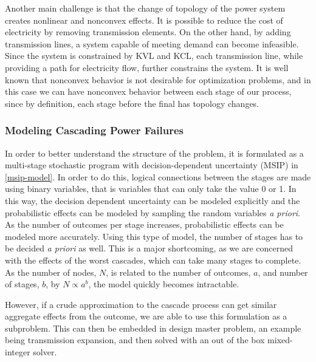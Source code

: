 Another main challenge is that the change of topology of the power system creates nonlinear and nonconvex effects.  It is possible to reduce the cost of electricity by removing transmission elements.  On the other hand, by adding transmission lines, a system capable of meeting demand can become infeasible.  Since the system is constrained by KVL and KCL, each transmission line, while providing a path for electricity flow, further constrains the system.  It is well known that nonconvex behavior is not desirable for optimization problems, and in this case we can have nonconvex behavior between each stage of our process, since by definition, each stage before the final has topology changes.

\subsubsection{Modeling Cascading Power Failures}
In order to better understand the structure of the problem, it is formulated as a multi-stage stochastic program with decision-dependent uncertainty (MSIP) in \cref{msip-model}.  In order to do this, logical connections between the stages are made using binary variables, that is variables that can only take the value 0 or 1.  In this way, the decision dependent uncertainty can be modeled explicitly and the probabilistic effects can be modeled by sampling the random variables {\it a priori}.  As the number of outcomes per stage increases, probabilistic effects can be modeled more accurately.  Using this type of model, the number of stages has to be decided {\it a priori} as well.  This is a major shortcoming, as we are concerned with the effects of the worst cascades, which can take many stages to complete.  As the number of nodes, $N$, is related to the number of outcomes, $a$, and number of stages, $b$, by $N \propto a^{b}$, the model quickly becomes intractable. 

 However, if a crude approximation to the cascade process can get similar aggregate effects from the outcome, we are able to use this formulation as a subproblem.  This can then be embedded in design master problem, an example being transmission expansion, and then solved with an out of the box mixed-integer solver.

